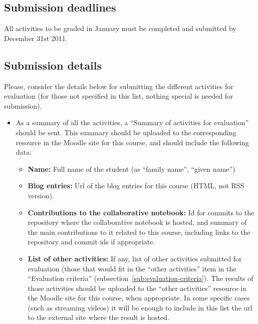 \documentclass[a4paper]{article}
\begin{document}
\subsection{Submission deadlines}

All activities to be graded in January must be completed and submitted by December 31st 2011.

\subsection{Submission details}

Please, consider the details below for submitting the different activities for evaluation (for those not specified in this list, nothing special is needed for submission).

\begin{itemize}
\item As a summary of all the activities, a ``Summary of activities for evaluation'' should be sent. This summary should be uploaded to the corresponding resource in the Moodle site for this course, and should include the following data:
  \begin{itemize}
  \item \textbf{Name:} Full name of the student (as ``family name'', ``given name'')
  \item \textbf{Blog entries:} Url of the blog entries for this course (HTML, not RSS version).
  \item \textbf{Contributions to the collaborative notebook:} Id for commits to the repository where the collaborative notebook is hosted, and summary of the main contributions to it related to this course, including links to the repository and commit ids if appropriate.
  \item \textbf{List of other activities:} If any, list of other activities submitted for evaluation (those that would fit in the ``other activities'' item in the ``Evaluation criteria'' (subsection~\ref{sub:evaluation-criteria}). The results of those activities should be uploaded to the ``other activities'' resource in the Moodle site for this course, when appropriate. In some specific cases (such as streaming videos) it will be enough to include in this list the url to the external site where the result is hosted.
  \end{itemize}
\end{itemize}

\end{document}
